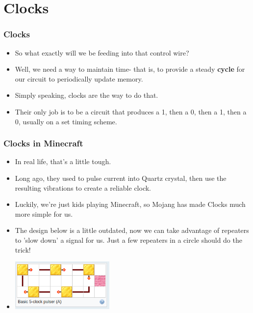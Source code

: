 \documentclass{beamer}
\begin{document}
   		
   	
   	\section{Clocks}
   	
   		\begin{frame}
   			\frametitle{Clocks}
   			\begin{itemize}
   				\item So what exactly will we be feeding into that control wire?
   				\item Well, we need a way to maintain time- that is, to provide a steady \textbf{cycle} for our circuit to periodically update memory.
   				\item Simply speaking, clocks are the way to do that.
   				\item Their only job is to be a circuit that produces a 1, then a 0, then a 1, then a 0, usually on a set timing scheme.
   			\end{itemize}
   		\end{frame}
   		
   		\begin{frame}
   			\frametitle{Clocks in Minecraft}
   			\begin{itemize}
   				\item In real life, that's a little tough.
   				\item Long ago, they used to pulse current into Quartz crystal, then use the resulting vibrations to create a reliable clock.
   				\item Luckily, we're just kids playing Minecraft, so Mojang has made Clocks much more simple for us.
   				\item The design below is a little outdated, now we can take advantage of repeaters to 'slow down' a signal for us. Just a few repeaters in a circle should do the trick!
   				\item \includegraphics[width=0.4\textwidth]{clock}
   			\end{itemize}
   			
   			
   		\end{frame}
   	
\end{document}
